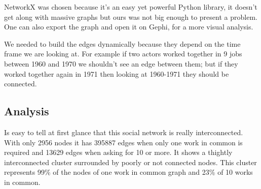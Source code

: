 NetworkX was chosen because it's an easy yet powerful Python library, it doesn't get along with massive graphs but ours was not big enough to present a problem. One can also export the graph and open it on Gephi, for a more visual analysis.

We needed to build the edges dynamically because they depend on the time frame we are looking at. For example if two actors worked together in 9 jobs between 1960 and 1970 we shouldn't see an edge between them; but if they worked together again in 1971 then looking at 1960-1971 they should be connected.

\subsection{Analysis}
Is easy to tell at first glance that this social network is really interconnected. With only 2956 nodes it has 395887 edges when only one work in common is required and 13629 edges when asking for 10 or more. It shows a thightly interconnected cluster surrounded by poorly or not connected nodes. This cluster represents 99\% of the nodes of one work in common graph and 23\% of 10 works in common.

